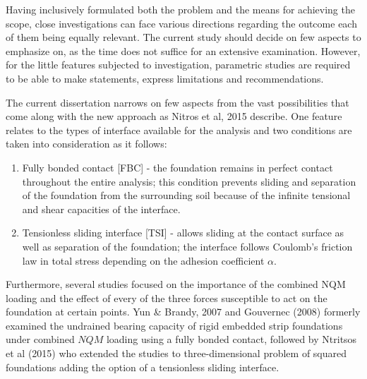 \documentclass[12pt,a4paper]{report}
\begin{document}
Having inclusively formulated both the problem and the means for achieving the scope, close investigations can face various directions regarding the outcome each of them being equally relevant. The current study should decide on few aspects to emphasize on, as the time does not suffice for an extensive examination. However, for the little features subjected to investigation, parametric studies are required to be able to make statements, express limitations and recommendations.

The current dissertation narrows on few aspects from the vast possibilities that come along with the new approach as Nitros et al, 2015 \cite{ntritsos2015static} describe. One feature relates to the types of interface available for the analysis and two conditions are taken into consideration as it follows:
\begin{enumerate}
	\item Fully bonded contact [FBC] - the foundation remains in perfect contact throughout the entire analysis; this condition prevents sliding and separation of the foundation from the surrounding soil because of the infinite tensional and shear capacities of the interface.
	\item Tensionless sliding interface [TSI] - allows sliding at the contact surface as well as separation of the foundation; the interface follows Coulomb's friction law in total stress depending on the adhesion coefficient $\alpha$.
\end{enumerate}


Furthermore, several studies focused on the importance of the combined NQM loading and the effect of every of the three forces susceptible to act on the foundation at certain points. Yun \& Brandy, 2007 and Gouvernec (2008) \cite{randolph2011offshore} formerly examined the undrained bearing capacity of rigid embedded strip foundations under combined $NQM$ loading using a fully bonded contact, followed by Ntritsos et al (2015) who extended the studies to three-dimensional problem of squared foundations adding the option of a tensionless sliding interface.
\end{document}
